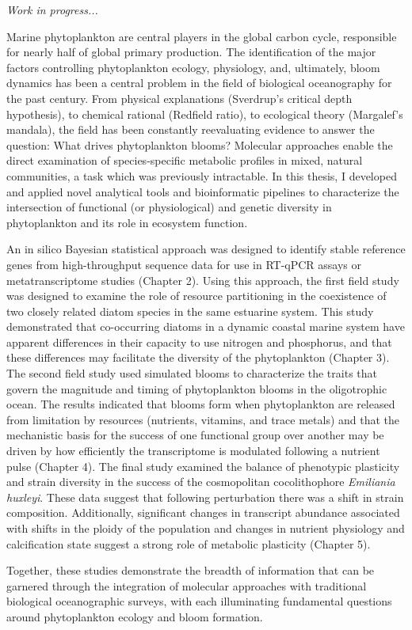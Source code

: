 % 
% 
%
\textit{Work in progress... }\par
Marine phytoplankton are central players in the global carbon cycle, responsible for nearly half of global primary production. The identification of the major factors controlling phytoplankton ecology, physiology, and, ultimately, bloom dynamics has been a central problem in the field of biological oceanography for the past century. From physical explanations (Sverdrup's critical depth hypothesis), to chemical rational (Redfield ratio), to ecological theory (Margalef's mandala), the field has been constantly reevaluating evidence to answer the question: What drives phytoplankton blooms? Molecular approaches enable the direct examination of species-specific metabolic profiles in mixed, natural communities, a task which was previously intractable. In this thesis, I developed and applied novel analytical tools and bioinformatic pipelines to characterize the intersection of functional (or physiological) and genetic diversity in phytoplankton and its role in ecosystem function.  \par
An in silico Bayesian statistical approach was designed to identify stable reference genes from high-throughput sequence data for use in RT-qPCR assays or metatranscriptome studies (Chapter 2). Using this approach, the first field study was designed to examine the role of resource partitioning in the coexistence of two closely related diatom species in the same estuarine system. This study demonstrated that co-occurring diatoms in a dynamic coastal marine system have apparent differences in their capacity to use nitrogen and phosphorus, and that these differences may facilitate the diversity of the phytoplankton (Chapter 3). The second field study used simulated blooms to characterize the traits that govern the magnitude and timing of phytoplankton blooms in the oligotrophic ocean. The results indicated that blooms form when phytoplankton are released from limitation by resources (nutrients, vitamins, and trace metals) and that the mechanistic basis for the success of one functional group over another may be driven by how efficiently the transcriptome is modulated following a nutrient pulse (Chapter 4). The final study examined the balance of phenotypic plasticity and strain diversity in the success of the cosmopolitan cocolithophore \textit{Emiliania huxleyi}. These data suggest that following perturbation there was a shift in strain composition. Additionally, significant changes in transcript abundance associated with shifts in the ploidy of the population and changes in nutrient physiology and calcification state suggest a strong role of metabolic plasticity (Chapter 5). \par
Together, these studies demonstrate the breadth of information that can be garnered through the integration of molecular approaches with traditional biological oceanographic surveys, with each illuminating fundamental questions around phytoplankton ecology and bloom formation.



